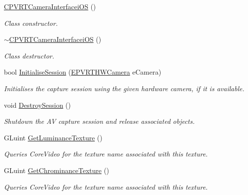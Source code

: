 \begin{DoxyCompactItemize}
\item 
\hyperlink{class_c_p_v_r_t_camera_interfacei_o_s_a0b43bb0acc9afb7ae793d69764bdd396}{C\+P\+V\+R\+T\+Camera\+Interfacei\+O\+S} ()
\begin{DoxyCompactList}\small\item\em Class constructor. \end{DoxyCompactList}\item 
\hyperlink{class_c_p_v_r_t_camera_interfacei_o_s_aaf7d7373b4352e240c410acbaf097489}{$\sim$\+C\+P\+V\+R\+T\+Camera\+Interfacei\+O\+S} ()
\begin{DoxyCompactList}\small\item\em Class destructor. \end{DoxyCompactList}\item 
bool \hyperlink{class_c_p_v_r_t_camera_interfacei_o_s_ade009e8f6ca9697e552dac036b1be97e}{Initialise\+Session} (\hyperlink{group___a_p_i___c_a_m_e_r_a_i_n_t_e_r_f_a_c_e_ga973910e3cdfc4daa01afa5adc2fccfdb}{E\+P\+V\+R\+T\+H\+W\+Camera} e\+Camera)
\begin{DoxyCompactList}\small\item\em Initialises the capture session using the given hardware camera, if it is available. \end{DoxyCompactList}\item 
void \hyperlink{class_c_p_v_r_t_camera_interfacei_o_s_a983f995f2c0eaeba3e720b31aa56bead}{Destroy\+Session} ()
\begin{DoxyCompactList}\small\item\em Shutdown the A\+V capture session and release associated objects. \end{DoxyCompactList}\item 
G\+Luint \hyperlink{class_c_p_v_r_t_camera_interfacei_o_s_a793f44fc5cfb7af9b78fe0294d20e42d}{Get\+Luminance\+Texture} ()
\begin{DoxyCompactList}\small\item\em Queries Core\+Video for the texture name associated with this texture. \end{DoxyCompactList}\item 
G\+Luint \hyperlink{class_c_p_v_r_t_camera_interfacei_o_s_a39696e12aa12249fb18b94f7b90e6818}{Get\+Chrominance\+Texture} ()
\begin{DoxyCompactList}\small\item\em Queries Core\+Video for the texture name associated with this texture. \end{DoxyCompactList}\item 

\end{DoxyCompactItemize}
